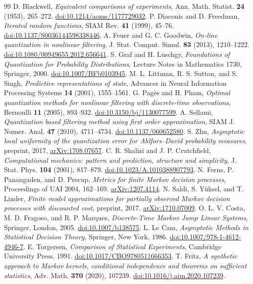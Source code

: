 \begin{thebibliography}{99}
 D. Blackwell, \emph{Equivalent comparisons of experiments}, Ann. Math. Statist. \textbf{24} (1953), 265--272. \href{https://doi.org/10.1214/aoms/1177729032}{doi:10.1214/aoms/1177729032}.
 P. Diaconis and D. Freedman, \emph{Iterated random functions}, SIAM Rev. \textbf{41} (1999), 45--76. \href{https://doi.org/10.1137/S0036144598338446}{doi:10.1137/S0036144598338446}.
 A. Feuer and G. C. Goodwin, \emph{On-line quantization in nonlinear filtering}, J. Stat. Comput. Simul. \textbf{83} (2013), 1210--1222. \href{https://doi.org/10.1080/00949655.2012.656641}{doi:10.1080/00949655.2012.656641}.
 S. Graf and H. Luschgy, \emph{Foundations of Quantization for Probability Distributions}, Lecture Notes in Mathematics 1730, Springer, 2000. \href{https://doi.org/10.1007/BFb0103945}{doi:10.1007/BFb0103945}.
 M. L. Littman, R. S. Sutton, and S. Singh, \emph{Predictive representations of state}, Advances in Neural Information Processing Systems \textbf{14} (2001), 1555--1561.
 G. Pag\`es and H. Pham, \emph{Optimal quantization methods for nonlinear filtering with discrete-time observations}, Bernoulli \textbf{11} (2005), 893--932. \href{https://doi.org/10.3150/bj/1130077599}{doi:10.3150/bj/1130077599}.
 A. Sellami, \emph{Quantization based filtering method using first order approximation}, SIAM J. Numer. Anal. \textbf{47} (2010), 4711--4734. \href{https://doi.org/10.1137/060652580}{doi:10.1137/060652580}.
 S. Zhu, \emph{Asymptotic local uniformity of the quantization error for Ahlfors--David probability measures}, preprint, 2017, \href{https://arxiv.org/abs/1708.07657}{arXiv:1708.07657}.
 C. R. Shalizi and J. P. Crutchfield, \emph{Computational mechanics: pattern and prediction, structure and simplicity}, J. Stat. Phys. \textbf{104} (2001), 817--879. \href{https://doi.org/10.1023/A:1010388907793}{doi:10.1023/A:1010388907793}.
 N. Ferns, P. Panangaden, and D. Precup, \emph{Metrics for finite Markov decision processes}, Proceedings of UAI 2004, 162--169. \href{https://arxiv.org/abs/1207.4114}{arXiv:1207.4114}.
 N. Saldi, S. Y\"uksel, and T. Linder, \emph{Finite model approximations for partially observed Markov decision processes with discounted cost}, preprint, 2017. \href{https://arxiv.org/abs/1710.07009}{arXiv:1710.07009}.
 O. L. V. Costa, M. D. Fragoso, and R. P. Marques, \emph{Discrete-Time Markov Jump Linear Systems}, Springer, London, 2005. \href{https://doi.org/10.1007/b138575}{doi:10.1007/b138575}.
 L. Le Cam, \emph{Asymptotic Methods in Statistical Decision Theory}, Springer, New York, 1986. \href{https://doi.org/10.1007/978-1-4612-4946-7}{doi:10.1007/978-1-4612-4946-7}.
 E. Torgersen, \emph{Comparison of Statistical Experiments}, Cambridge University Press, 1991. \href{https://doi.org/10.1017/CBO9780511666353}{doi:10.1017/CBO9780511666353}.
 T. Fritz, \emph{A synthetic approach to Markov kernels, conditional independence and theorems on sufficient statistics}, Adv. Math. \textbf{370} (2020), 107239. \href{https://doi.org/10.1016/j.aim.2020.107239}{doi:10.1016/j.aim.2020.107239}.
\end{thebibliography}
